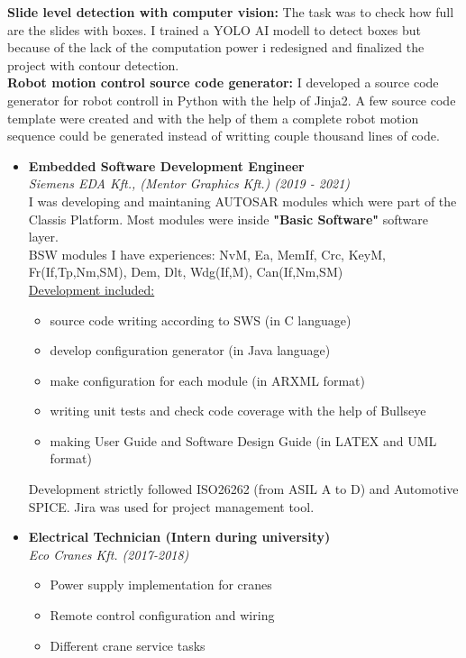 \documentclass[11pt,oneslide,a4paper,titlepage]{article}
\begin{document}
\newpage
{}
\raggedright
\textbf{Slide level detection with computer vision:} The task was to check how full are the slides with boxes. I trained a YOLO AI modell to detect boxes but because of the lack of the computation power i redesigned and finalized the project with contour detection. \\ 

\hfill\break
\textbf{Robot motion control source code generator:}
I developed a source code generator for robot controll in Python with the help of Jinja2.
A few source code template were created and with the help of them a complete robot motion sequence could be generated instead of writting couple thousand lines of code.

\hfill\break
\begin{itemize}
	\item{
		\textbf{Embedded Software Development Engineer} \\
		\emph{Siemens EDA Kft., (Mentor Graphics Kft.) (2019 - 2021)} \\
		\hfill\break
	    I was developing and maintaning AUTOSAR modules which were part of the Classis Platform. Most modules were inside \textbf{"Basic Software"} software layer. \\
		\hfill\break
	    BSW modules I have experiences: NvM, Ea, MemIf, Crc, KeyM, Fr(If,Tp,Nm,SM), Dem, Dlt, Wdg(If,M), Can(If,Nm,SM) \\
		\hfill\break
		\underline{Development included:}
		\begin{itemize}
			\item{
				source code writing according to SWS (in C language)		
			}
			\item{
			develop configuration generator (in Java language)
			}
			\item{
			make configuration for each module (in ARXML format)
			}
			\item{
			writing unit tests and check code coverage with the help of Bullseye	
			}
			\item{
			making User Guide and Software Design Guide (in LATEX and UML format)			
			}
		\end{itemize}
		
		Development strictly followed ISO26262 (from ASIL A to D) and Automotive SPICE. Jira was used for project management tool.
	}
	\hfill\break
	\item{
		\textbf{Electrical Technician (Intern during university)} \\
		\emph{Eco Cranes Kft. (2017-2018)}
		\begin{itemize}
			\item{Power supply implementation for cranes}
			\item{Remote control configuration and wiring}
			\item{Different crane service tasks}
		\end{itemize}
	}
\end{itemize}
\end{document}
